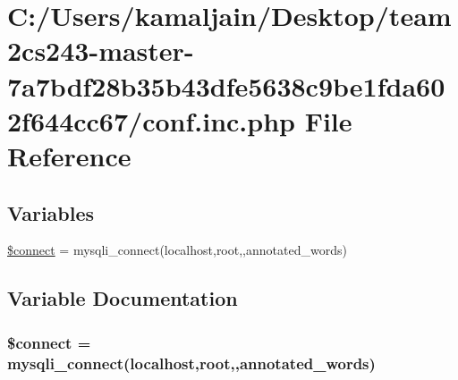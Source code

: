 \hypertarget{conf_8inc_8php}{}\section{C\+:/\+Users/kamaljain/\+Desktop/team2cs243-\/master-\/7a7bdf28b35b43dfe5638c9be1fda602f644cc67/conf.inc.\+php File Reference}
\label{conf_8inc_8php}
\subsection*{Variables}
\begin{DoxyCompactItemize}
\item 
\hyperlink{conf_8inc_8php_a956617395b85e98d907df712f6d0d3f7}{\$connect} = mysqli\+\_\+connect(\textquotesingle{}localhost\textquotesingle{},\textquotesingle{}root\textquotesingle{},\textquotesingle{}\textquotesingle{},\textquotesingle{}annotated\+\_\+words\textquotesingle{})
\end{DoxyCompactItemize}


\subsection{Variable Documentation}
\subsubsection[{\texorpdfstring{\$connect}{$connect}}]{\setlength{\rightskip}{0pt plus 5cm}\$connect = mysqli\+\_\+connect(\textquotesingle{}localhost\textquotesingle{},\textquotesingle{}root\textquotesingle{},\textquotesingle{}\textquotesingle{},\textquotesingle{}annotated\+\_\+words\textquotesingle{})}\hypertarget{conf_8inc_8php_a956617395b85e98d907df712f6d0d3f7}{}\label{conf_8inc_8php_a956617395b85e98d907df712f6d0d3f7}

